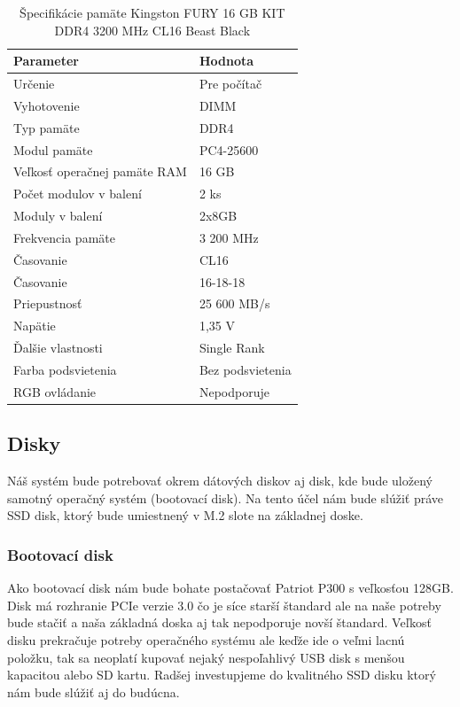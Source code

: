 \documentclass[12pt,oneside,slovak,a4paper]{article}
\begin{document}
\begin{table}[h]
\centering
\begin{tabularx}{\textwidth}{|l|X|}
\hline
\textbf{Parameter} & \textbf{Hodnota} \\ \hline
Určenie & Pre počítač \\ \hline
Vyhotovenie & DIMM \\ \hline
Typ pamäte & DDR4 \\ \hline
Modul pamäte & PC4-25600 \\ \hline
Veľkosť operačnej pamäte RAM & 16 GB \\ \hline
Počet modulov v balení & 2 ks \\ \hline
Moduly v balení & 2x8GB \\ \hline
Frekvencia pamäte & 3 200 MHz \\ \hline
Časovanie & CL16 \\ \hline
Časovanie & 16-18-18 \\ \hline
Priepustnosť & 25 600 MB/s \\ \hline
Napätie & 1,35 V \\ \hline
Ďalšie vlastnosti & Single Rank \\ \hline
Farba podsvietenia & Bez podsvietenia \\ \hline
RGB ovládanie & Nepodporuje \\ \hline
\end{tabularx}
\captionsetup{justification=centering,margin=2cm}
\caption{Špecifikácie pamäte Kingston FURY 16 GB KIT DDR4 3200 MHz CL16 Beast Black}
\end{table}

\subsection{Disky}
Náš systém bude potrebovať okrem dátových diskov aj disk, kde bude uložený samotný operačný systém (bootovací disk). Na tento účel nám bude slúžiť práve SSD disk, ktorý bude umiestnený v M.2 slote na základnej doske.

\subsubsection{Bootovací disk}
Ako bootovací disk nám bude bohate postačovať Patriot P300 s veľkosťou 128GB. Disk má rozhranie PCIe verzie 3.0 čo je síce starší štandard ale na naše potreby bude stačiť a naša základná doska aj tak nepodporuje novší štandard. Veľkosť disku prekračuje potreby operačného systému ale keďže ide o veľmi lacnú položku, tak sa neoplatí kupovať nejaký nespoľahlivý USB disk s menšou kapacitou alebo SD kartu. Radšej investupjeme do kvalitného SSD disku ktorý nám bude slúžiť aj do budúcna.
\end{document}
